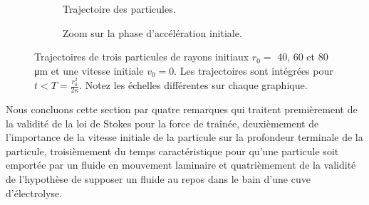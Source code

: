 \begin{figure}
 \begin{center}
    \begin{subfigure}[b]{0.49\textwidth}
      
      \caption{Trajectoire des particules.}
      \label{fig:particle-trajectories-a}
    \end{subfigure}
    \begin{subfigure}[b]{0.49\textwidth}
      
      \caption{Zoom sur la phase d'accélération initiale.}
      \label{fig:particle-trajectories-b}
    \end{subfigure}

    \caption{Trajectoires de trois particules de rayons initiaux $r_0 =
      $ 40, 60 et 80 \si{\micro\meter} et une vitesse initiale $v_0 =
      0$. Les trajectoires sont intégrées pour $t < T =
      \frac{r_0^2}{2\kappa}$. Notez les échelles différentes sur
      chaque graphique.}
    \label{fig:particle-trajectories}
  \end{center}
\end{figure}

Nous concluons cette section par quatre remarques qui traitent
premièrement de la validité de la loi de Stokes pour la force de traînée,
deuxièmement de l'importance de la vitesse initiale de la particule
sur la profondeur terminale de la particule, troisièmement du temps
caractéristique pour qu'une particule soit emportée par un fluide en
mouvement laminaire et quatrièmement de la validité de l'hypothèse de
supposer un fluide au repos dans le bain d'une cuve d'électrolyse.




